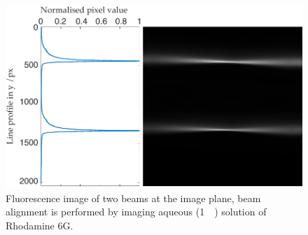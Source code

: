 \begin{figure}
  \centering
  \includegraphics{dual_beam_profile}
  \caption[Fluorescence image of two beams at the image plane]{Fluorescence image of two beams at the image plane, beam alignment is performed by imaging aqueous (\SI{1}{\milli{}}) solution of Rhodamine 6G.}\label{fig:real_dual_beams}
\end{figure}
%

